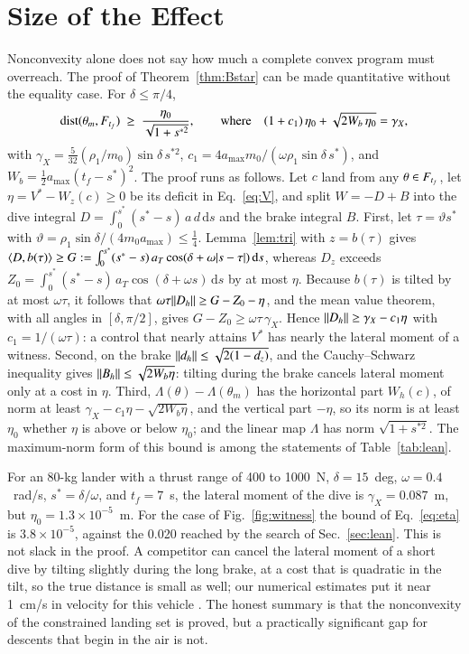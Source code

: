 \section{Size of the Effect}\label{sec:size}
Nonconvexity alone does not say how much a complete convex program must overreach. The proof of Theorem~\ref{thm:Bstar} can
be made quantitative without the equality case. For $\delta\le\pi/4$,
\begin{equation}\label{eq:eta}
\operatorname{dist}(\theta_m,\F)\ \ge\ \frac{\eta_0}{\sqrt{1+s^{*2}}},\qquad\text{where}\quad
(1+c_1)\,\eta_0+\sqrt{2W_b\,\eta_0}=\gamma_X ,
\end{equation}
with $\gamma_X=\tfrac5{32}(\rho_1/m_0)\sin\delta\,s^{*2}$, $c_1=4a_{\max}m_0/(\omega\rho_1\sin\delta\,s^*)$, and
$W_b=\tfrac12a_{\max}(t_f-s^*)^2$. The proof runs as follows. Let $c$ land from any $\theta\in F_{t_f}$, let $\eta=V^*-W_z(c)\ge0$ be its deficit
in Eq.~\eqref{eq:V}, and split $W=-D+B$ into the dive integral $D=\int_0^{s^*}(s^*-s)\,a\,d\,\mathrm ds$ and the brake
integral $B$. First, let $\tau=\vartheta s^*$ with $\vartheta=\rho_1\sin\delta/(4m_0a_{\max})\le\tfrac14$. Lemma~\ref{lem:tri}
with $z=b(\tau)$ gives $\langle D,b(\tau)\rangle\ge G:=\int_0^{s^*}(s^*-s)\,a_T\cos(\delta+\omega\lvert s-\tau\rvert)\,\mathrm ds$, whereas
$D_z$ exceeds $Z_0=\int_0^{s^*}(s^*-s)\,a_T\cos(\delta+\omega s)\,\mathrm ds$ by at most $\eta$. Because $b(\tau)$ is tilted by at
most $\omega\tau$, it follows that $\omega\tau\lVert D_h\rVert\ge G-Z_0-\eta$, and the mean value theorem, with all angles in
$[\delta,\pi/2]$, gives $G-Z_0\ge\omega\tau\,\gamma_X$. Hence $\lVert D_h\rVert\ge\gamma_X-c_1\eta$ with $c_1=1/(\omega\tau)$: a
control that nearly attains $V^*$ has nearly the lateral moment of a witness. Second, on the brake
$\lVert d_h\rVert\le\sqrt{2(1-d_z)}$, and the Cauchy--Schwarz inequality gives $\lVert B_h\rVert\le\sqrt{2W_b\eta}$: tilting during the
brake cancels lateral moment only at a cost in $\eta$. Third, $\Lambda(\theta)-\Lambda(\theta_m)$ has the horizontal part
$W_h(c)$, of norm at least $\gamma_X-c_1\eta-\sqrt{2W_b\eta}$, and the vertical part $-\eta$, so its norm is at least $\eta_0$
whether $\eta$ is above or below $\eta_0$; and the linear map $\Lambda$ has norm $\sqrt{1+s^{*2}}$. The maximum-norm form of
this bound is among the statements of Table~\ref{tab:lean}.

For an 80-kg lander with a thrust range of 400 to 1000~N, $\delta=15$~deg, $\omega=0.4$~rad/s, $s^*=\delta/\omega$, and
$t_f=7$~s, the lateral moment of the dive is $\gamma_X=0.087$~m, but $\eta_0=1.3\times10^{-5}$~m. For the case of
Fig.~\ref{fig:witness} the bound of Eq.~\eqref{eq:eta} is $3.8\times10^{-5}$, against the 0.020 reached by the search of
Sec.~\ref{sec:lean}. This is not slack in the proof. A competitor can cancel the lateral
moment of a short dive by tilting slightly during the long brake, at a cost that is quadratic in the tilt, so the true
distance is small as well; our numerical estimates put it near 1~cm/s in velocity for this vehicle \cite{repo}. The honest
summary is that the nonconvexity of the constrained landing set is proved, but a practically significant gap for descents
that begin in the air is not.

